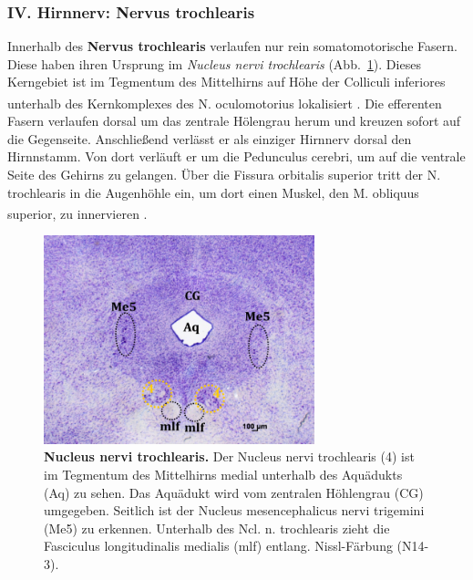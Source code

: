 \documentclass[12pt,a4paper,pdftex]{article}
\begin{document}
\subsubsection*{IV. Hirnnerv: Nervus trochlearis} 
Innerhalb des \textbf{Nervus trochlearis} verlaufen nur rein somatomotorische Fasern. Diese haben ihren Ursprung im \textit{Nucleus nervi trochlearis}  (Abb.~\ref{fig:nucleus_trochlearis}). Dieses Kerngebiet ist im Tegmentum des Mittelhirns auf Höhe der Colliculi inferiores unterhalb des Kernkomplexes des N. oculomotorius lokalisiert \textsuperscript{\cite[5]{trepel2011neuroanatomie}}. Die efferenten Fasern verlaufen dorsal um das zentrale Hölengrau herum und kreuzen sofort auf die Gegenseite. Anschließend verlässt er als einziger Hirnnerv dorsal den Hirnnstamm. Von dort verläuft er um die Pedunculus cerebri, um auf die ventrale Seite des Gehirns zu gelangen. Über die Fissura orbitalis superior tritt der N. trochlearis in die Augenhöhle ein, um dort einen Muskel, den M. obliquus superior, zu innervieren \textsuperscript{\cite[10]{crossman2014neuroanatomy}}.   

\begin{figure}[H]
    \centering
    \includegraphics[width=0.7\textwidth]{pictures/Bilder_Laura/nucleus_trochlearis_N14_3M_25x.png}
    \caption[Nucleus nervi trochlearis]{\textbf{Nucleus nervi trochlearis.} Der Nucleus nervi trochlearis (4) ist im Tegmentum des Mittelhirns medial unterhalb des Aquädukts (Aq) zu sehen. Das Aquädukt wird vom zentralen Höhlengrau (CG) umgegeben. Seitlich ist der  Nucleus mesencephalicus nervi trigemini (Me5) zu erkennen. Unterhalb des Ncl. n. trochlearis zieht die Fasciculus longitudinalis medialis (mlf) entlang. Nissl-Färbung (N14-3).}
    \label{fig:nucleus_trochlearis}
\end{figure}
\end{document}
